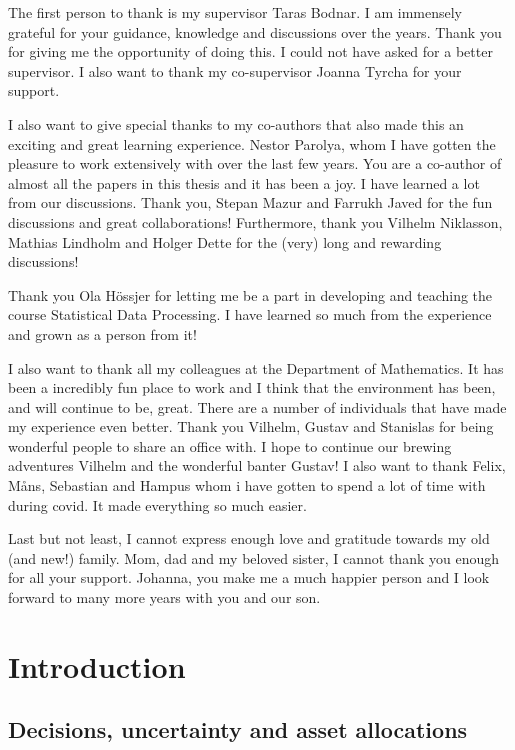\documentclass[12pt, oneside]{book}\usepackage{knitr}
\begin{document}
{The first person to thank is my supervisor Taras Bodnar.
I am immensely grateful for your guidance, knowledge and discussions over the years.
Thank you for giving me the opportunity of doing this.
I could not have asked for a better supervisor.
I also want to thank my co-supervisor Joanna Tyrcha for your support.

I also want to give special thanks to my co-authors that also made this an exciting and great learning experience.
Nestor Parolya, whom I have gotten the pleasure to work extensively with over the last few years. 
You are a co-author of almost all the papers in this thesis and it has been a joy.
I have learned a lot from our discussions.
Thank you, Stepan Mazur and Farrukh Javed for the fun discussions and great collaborations!
Furthermore, thank you Vilhelm Niklasson, Mathias Lindholm and Holger Dette for the (very) long and rewarding discussions! 

Thank you Ola Hössjer for letting me be a part in developing and teaching the course Statistical Data Processing.
I have learned so much from the experience and grown as a person from it!

I also want to thank all my colleagues at the Department of Mathematics.
It has been a incredibly fun place to work and I think that the environment has been, and will continue to be, great.
There are a number of individuals that have made my experience even better.
Thank you Vilhelm, Gustav and Stanislas for being wonderful people to share an office with.
I hope to continue our brewing adventures Vilhelm and the wonderful banter Gustav!
I also want to thank Felix, Måns, Sebastian and Hampus whom i have gotten to spend a lot of time with during covid. 
It made everything so much easier.

Last but not least, I cannot express enough love and gratitude towards my old (and new!) family. 
Mom, dad and my beloved sister, I cannot thank you enough for all your support.
Johanna, you make me a much happier person and I look forward to many more years with you and our son. 
\newpage

\tableofcontents

\part{Introduction}
\chapter{Decisions, uncertainty and asset allocations}\label{ch:intro}

}
\end{document}
